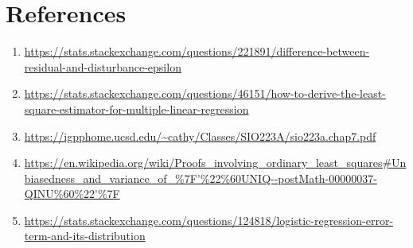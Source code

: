 \section{References}
\begin{enumerate}
    \item \url{https://stats.stackexchange.com/questions/221891/difference-between-residual-and-disturbance-epsilon}
    \item \url{https://stats.stackexchange.com/questions/46151/how-to-derive-the-least-square-estimator-for-multiple-linear-regression}
    \item \url{https://igpphome.ucsd.edu/~cathy/Classes/SIO223A/sio223a.chap7.pdf}
    \item \url{https://en.wikipedia.org/wiki/Proofs_involving_ordinary_least_squares#Unbiasedness_and_variance_of_%7F'%22%60UNIQ--postMath-00000037-QINU%60%22'%7F}
    \item \url{https://stats.stackexchange.com/questions/124818/logistic-regression-error-term-and-its-distribution}
\end{enumerate}
